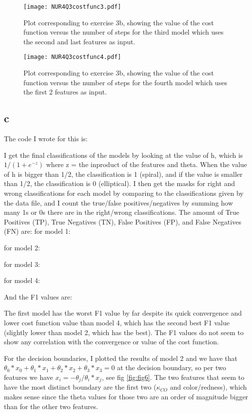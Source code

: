 \begin{figure}[h!]
  \centering
  \texttt{[image: NUR4Q3costfunc3.pdf]}
  \caption{Plot corresponding to exercise 3b, showing the value of the cost function versus the number of steps for the third model which uses the second and last features as input.}
  \label{fig:fig4}
\end{figure} 


\begin{figure}[h!]
  \centering
  \texttt{[image: NUR4Q3costfunc4.pdf]}
  \caption{Plot corresponding to exercise 3b, showing the value of the cost function versus the number of steps for the fourth model which uses the first 2 features as input.}
  \label{fig:fig5}
\end{figure} 


\subsection*{c}

The code I wrote for this is:


I get the final classifications of the models by looking at the value of h, which is $1/(1+e^{-z})$ where z = the inproduct of the features and theta. 
When the value of h is bigger than 1/2, the classification is 1 (spiral), and if the value is smaller than 1/2, the classification is 0 (elliptical). 
I then get the masks for right and wrong classifications for each model by comparing to the classifications given by the data file, and I count the true/false positives/negatives by summing how many 1s or 0s there are in the right/wrong classifications. 
The amount of True Positives (TP), True Negatives (TN), False Positives (FP), and False Negatives (FN) are:
for model 1:

for model 2:

for model 3:

for model 4:

And the F1 values are:


The first model has the worst F1 value by far despite its quick convergence and lower cost function value than model 4, which has the second best F1 value (slightly lower than model 2, which has the best). The F1 values do not seem to show any correlation with the convergence or value of the cost function. 

For the decision boundaries, I plotted the results of model 2 and we have that $\theta_0 * x_0 + \theta_1 * x_1 + \theta_2 * x_2 + \theta_3 * x_3 = 0$ at the decision boundary, so per two features we have $x_i = -\theta_j/\theta_i * x_j$, see fig \ref{fig:fig6}. The two features that seem to have the most distinct boundary are the first two ($\kappa_{CO}$ and color/redness), which makes sense since the theta values for those two are an order of magnitude bigger than for the other two features.

